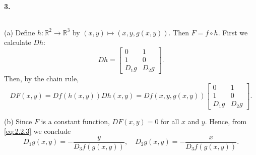   \paragraph{3.}
  \begin{solution}
    $\,$\par
    (a) Define $h:\mathbb{R}^2\to\mathbb{R}^3$ by $(x,y)\mapsto(x,y,g(x,y))$. 
    Then $F=f\circ h$. First we calculate $Dh$:
    \[
      Dh=\begin{bmatrix}
        0 & 1 \\ 1 & 0 \\ D_1g & D_2g
      \end{bmatrix}.
    \]
    Then, by the chain rule, 
    \begin{equation}
      \label{eq:2.2.3}
      DF(x,y)
      =Df(h(x,y))Dh(x,y)
      =Df(x,y,g(x,y))\begin{bmatrix}
        0 & 1 \\ 1 & 0 \\ D_1g & D_2g
      \end{bmatrix}.
    \end{equation}\par
    (b) Since $F$ is a constant function, $DF(x,y)=0$ for all $x$ and $y$. 
    Hence, from \eqref{eq:2.2.3} we conclude
    \[
      D_1g(x,y)=-\frac{y}{D_3f(g(x,y))},\quad
      D_2g(x,y)=-\frac{x}{D_3f(g(x,y))}.
    \]
  \end{solution}























